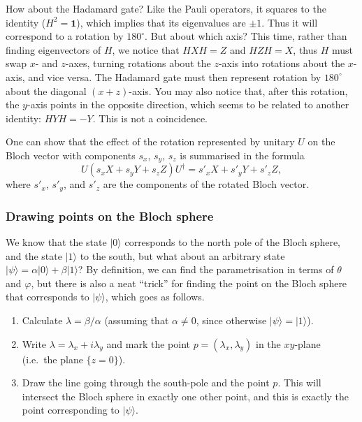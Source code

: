 \documentclass[fleqn]{article}
\providecommand{\tightlist}{%
  \setlength{\itemsep}{0pt}\setlength{\parskip}{0pt}}
\renewcommand{\footnote}[1]{\en{#1}}
\begin{document}
How about the Hadamard gate?
Like the Pauli operators, it squares to the identity (\(H^2=\mathbf{1}\)), which implies that its eigenvalues are \(\pm 1\).
Thus it will correspond to a rotation by \({180}^{\circ}\).
But about which axis?
This time, rather than finding eigenvectors of \(H\), we notice that \(HXH=Z\) and \(HZH=X\), thus \(H\) must swap \(x\)- and \(z\)-axes, turning rotations about the \(z\)-axis into rotations about the \(x\)-axis, and vice versa.
The Hadamard gate must then represent rotation by \({180}^{\circ}\) about the diagonal \((x+z)\)-axis.
You may also notice that, after this rotation, the \(y\)-axis points in the opposite direction, which seems to be related to another identity: \(HYH=-Y\).
This is not a coincidence.

One can show\footnote{Again, see \protect\hyperlink{quantum-gates}{Chapter 3}.} that the effect of the rotation represented by unitary \(U\) on the Bloch vector with components \(s_x\), \(s_y\), \(s_z\) is summarised in the formula
\[
  U (s_x X + s_y Y + s_z Z) U^\dagger
  = s'_x X+ s'_y Y + s'_z Z,
\]
where \(s'_x\), \(s'_y\), and \(s'_z\) are the components of the rotated Bloch vector.

\hypertarget{drawing-points-on-the-bloch-sphere}{%
\subsubsection{Drawing points on the Bloch sphere}\label{drawing-points-on-the-bloch-sphere}}

We know that the state \(|0\rangle\) corresponds to the north pole of the Bloch sphere, and the state \(|1\rangle\) to the south, but what about an arbitrary state \(|\psi\rangle=\alpha|0\rangle+\beta|1\rangle\)?
By definition, we can find the parametrisation in terms of \(\theta\) and \(\varphi\), but there is also a neat ``trick'' for finding the point on the Bloch sphere that corresponds to \(|\psi\rangle\), which goes as follows.

\begin{enumerate}
\def\labelenumi{\arabic{enumi}.}
\tightlist
\item
  Calculate \(\lambda=\beta/\alpha\) (assuming that \(\alpha\neq0\), since otherwise \(|\psi\rangle=|1\rangle\)).
\item
  Write \(\lambda=\lambda_x+i\lambda_y\) and mark the point \(p=(\lambda_x,\lambda_y)\) in the \(xy\)-plane (i.e.~the plane \(\{z=0\}\)).
\item
  Draw the line going through the south-pole and the point \(p\). This will intersect the Bloch sphere in exactly one other point, and this is exactly the point corresponding to \(|\psi\rangle\).
\end{enumerate}
\end{document}
